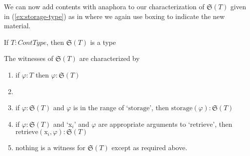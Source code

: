 
We can now add contents with anaphora to
our characterization of $\mathfrak{S}(T)$ given in
(\ref{ex:storage-type}) as in \nexteg{} where we again use boxing to
indicate the new material.
\begin{ex} 
\begin{subex} 
 
\item If $T:\textit{ContType}$, then $\mathfrak{S}(T)$ is a type 
 
\item The witnesses of $\mathfrak{S}(T)$ are characterized by
  \begin{enumerate} 
 
  \item if $\varphi:T$ then $\varphi:\mathfrak{S}(T)$

    
  \item {}
 
  \item if $\varphi:\mathfrak{S}(T)$ and $\varphi$ is in the range of `$\mathrm{storage}$', then
    $\mathrm{storage}(\varphi):\mathfrak{S}(T)$

  \item if $\varphi:\mathfrak{S}(T)$ and `x$_i$' and $\varphi$ are appropriate
    arguments to `$\mathrm{retrieve}$', then
    $\mathrm{retrieve}(\text{x}_i,\varphi):\mathfrak{S}(T)$
    
  \item nothing is a witness for $\mathfrak{S}(T)$ except as required above.
 
  \end{enumerate} 
  
 
\end{subex} 
\label{ex:storage-anaph-type}   
\end{ex}

